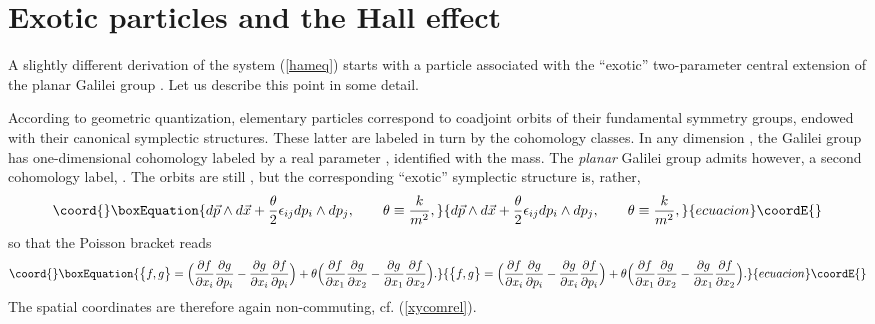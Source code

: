 \documentclass[a4paper,12pt]{article}
\providecommand{\IR}{{\bf R}}
\providecommand{\vx}{{\vec x}}
\providecommand{\vp}{{\vec p}}
\begin{document}
\section{Exotic particles and the Hall effect}

A slightly different derivation\cite{DH} of the system (\ref{hameq})
starts with  a particle associated with the ``exotic'' two-parameter 
central extension of the planar Galilei group \cite{exotic}.
Let us describe this point in some detail.

According to geometric quantization\cite{SSD,GQ}, elementary particles
correspond to coadjoint orbits of their fundamental symmetry groups,
endowed with their canonical symplectic structures. These latter are 
labeled in turn by the cohomology classes. In any dimension \coordHE{},
the Galilei group has one-dimensional cohomology labeled by a
real parameter \coordHE{}, identified with the mass. 
The {\it planar} Galilei group admits however, a second cohomology 
label, \coordHE{} \cite{exotic}. The orbits are still \myHighlight{$\IR^4$}\coordHE{}, but the 
corresponding ``exotic'' symplectic structure is, rather,
\begin{equation}\coord{}\boxEquation{
    d\vp\wedge d\vx+\frac{\theta}{2}\epsilon_{ij}dp_{i}\wedge dp_{j},
    \qquad
    \theta\equiv\frac{k}{m^2},
\label{exoticsymp}
}{
    d\vp\wedge d\vx+\frac{\theta}{2}\epsilon_{ij}dp_{i}\wedge dp_{j},
    \qquad
    \theta\equiv\frac{k}{m^2},
}{ecuacion}\coordE{}\end{equation}    
so that the Poisson bracket reads
\begin{equation}\coord{}\boxEquation{
    \big\{f, g\big\}=
    \Big(\frac{\partial f}{\partial x_{i}}\frac{\partial g}{\partial p_{i}}
    -
    \frac{\partial g}{\partial x_{i}}\frac{\partial f}{\partial p_{i}}\Big)
    +
    \theta\Big(
    \frac{\partial f}{\partial x_{1}}\frac{\partial g}{\partial x_{2}}
    -
    \frac{\partial g}{\partial x_{1}}\frac{\partial f}{\partial x_{2}}\Big).
\label{exoticPB}
}{
    \big\{f, g\big\}=
    \Big(\frac{\partial f}{\partial x_{i}}\frac{\partial g}{\partial p_{i}}
    -
    \frac{\partial g}{\partial x_{i}}\frac{\partial f}{\partial p_{i}}\Big)
    +
    \theta\Big(
    \frac{\partial f}{\partial x_{1}}\frac{\partial g}{\partial x_{2}}
    -
    \frac{\partial g}{\partial x_{1}}\frac{\partial f}{\partial x_{2}}\Big).
}{ecuacion}\coordE{}\end{equation}
The spatial coordinates are therefore again non-commuting,
\coordHE{}
 cf. (\ref{xycomrel}).
 
\end{document}
